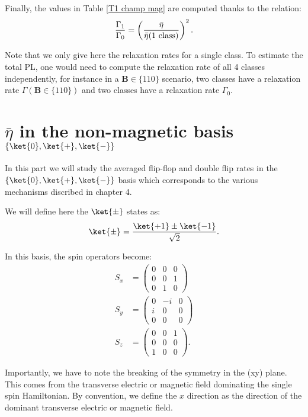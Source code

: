 \documentclass[a4paper, 11pt]{report}
\begin{document}
Finally, the values in Table \ref{T1 champ mag} are computed thanks to the relation: \begin{equation}
\frac{\Gamma_1}{\Gamma_0}= \left(\frac{\bar \eta}{\bar \eta(\rm{1\ class})} \right)^2.
\end{equation}

Note that we only give here the relaxation rates for a single class. To estimate the total PL, one would need to compute the relaxation rate of all 4 classes independently, for instance in a $\mathbf{B} \in \{110\}$ scenario, two classes have a relaxation rate $\Gamma(\mathbf{B} \in \{110\})$ and two classes have a relaxation rate $\Gamma_0$.

\section{$\bar \eta$ in the non-magnetic basis $\{ \ket{0}, \ket{+}, \ket{-}\}$}

In this part we will study the averaged flip-flop and double flip rates in the $\{ \ket{0}, \ket{+}, \ket{-}\}$ basis which corresponds to the various mechanisms discribed in chapter 4.

We will define here the $\ket{\pm}$ states as:
\begin{equation}
\ket{\pm}=\frac{\ket{+1}\pm\ket{-1}}{\sqrt{2}}.
\end{equation}

In this basis, the spin operators become:
\begin{align*}
S_x&=\begin{pmatrix}
0&0&0 \\
0&0&1 \\
0&1&0
\end{pmatrix} \\
S_y&=\begin{pmatrix}
0&-i&0 \\
i&0&0 \\
0&0&0
\end{pmatrix} \\
S_z&=\begin{pmatrix}
0&0&1 \\
0&0&0 \\
1&0&0
\end{pmatrix}.
\end{align*}


Importantly, we have to note the breaking of the symmetry in the (xy) plane. This comes from the transverse electric or magnetic field dominating the single spin Hamiltonian. By convention, we define the $x$ direction as the direction of the dominant transverse electric or magnetic field.
\end{document}

